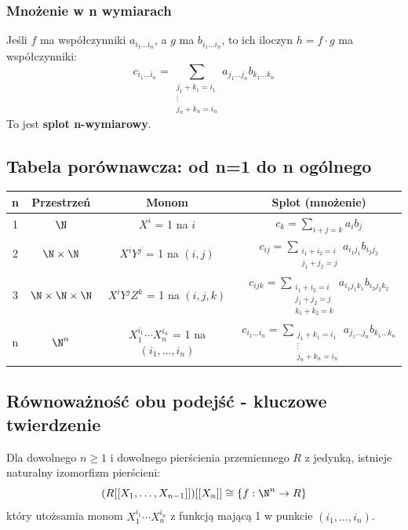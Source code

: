 \subsubsection{Mnożenie w n wymiarach}

Jeśli $f$ ma współczynniki $a_{i_1\dots i_n}$, a $g$ ma $b_{i_1\dots i_n}$, to ich iloczyn $h = f \cdot g$ ma współczynniki:
\[
c_{i_1\dots i_n} = \sum_{\substack{j_1+k_1 = i_1 \\ \vdots \\ j_n+k_n = i_n}} a_{j_1\dots j_n} b_{k_1\dots k_n}
\]
To jest \textbf{splot n-wymiarowy}.

\subsection{Tabela porównawcza: od n=1 do n ogólnego}

\begin{center}
\begin{tabular}{|c|c|c|c|}
\hline
\textbf{n} & \textbf{Przestrzeń} & \textbf{Monom} & \textbf{Splot (mnożenie)} \\
\hline
1 & $\N$ & $X^i$ = 1 na $i$ & $c_k = \sum_{i+j=k} a_i b_j$ \\
\hline
2 & $\N \times \N$ & $X^iY^j$ = 1 na $(i,j)$ & $c_{ij} = \sum_{\substack{i_1+i_2=i \\ j_1+j_2=j}} a_{i_1j_1} b_{i_2j_2}$ \\
\hline
3 & $\N \times \N \times \N$ & $X^iY^jZ^k$ = 1 na $(i,j,k)$ & $c_{ijk} = \sum_{\substack{i_1+i_2=i \\ j_1+j_2=j \\ k_1+k_2=k}} a_{i_1j_1k_1} b_{i_2j_2k_2}$ \\
\hline
n & $\N^n$ & $X_1^{i_1}\cdots X_n^{i_n}$ = 1 na $(i_1,\dots,i_n)$ & $c_{i_1\dots i_n} = \sum_{\substack{j_1+k_1=i_1 \\ \vdots \\ j_n+k_n=i_n}} a_{j_1\dots j_n} b_{k_1\dots k_n}$ \\
\hline
\end{tabular}
\end{center}

\subsection{Równoważność obu podejść - kluczowe twierdzenie}

\begin{theorem}
Dla dowolnego $n \geq 1$ i dowolnego pierścienia przemiennego $R$ z jedynką, istnieje naturalny izomorfizm pierścieni:
\[
(R[[X_1, \dots, X_{n-1}]])[[X_n]] \cong \left\{ f: \N^n \to R \right\}
\]
który utożsamia monom $X_1^{i_1}\cdots X_n^{i_n}$ z funkcją mającą 1 w punkcie $(i_1,\dots,i_n)$.
\end{theorem}


